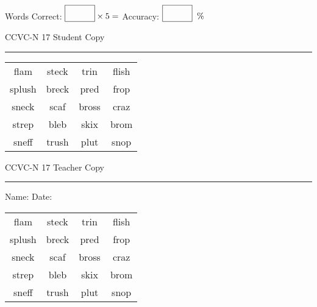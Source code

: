 \documentclass{memoir}
\begin{document}
\small

Words Correct: $\fbox{\phantom{\huge 100}} \times 5 = $ Accuracy: $\fbox{\phantom{\huge 100}}\;\; \%$ 

\vfill

\newpage


\footnotesize \noindent
CCVC-N 17 \hfill Student Copy
\smallskip
\hrule

\Large

\setlength{\tabcolsep}{14pt}
\def\arraystretch{3}

{\selectfont


\begin{vplace}[0.5]
\begin{center}
\begin{tabular}{cccc}
flam             & steck & trin & flish             \\
splush & breck       & pred & frop \\
sneck & scaf & bross       & craz       \\
strep & bleb & skix & brom          \\
sneff & trush & plut & snop \\
\end{tabular}
\end{center}
\end{vplace}

}

\newpage

\footnotesize \noindent
CCVC-N 17 \hfill Teacher Copy
\smallskip
\hrule

\small

\vfill

\noindent
Name: \underline{\hspace{1.75in}} \hfill Date: \underline{\hspace{1in}}

\Large

{\selectfont


\begin{vplace}[0.5]
\begin{center}
\begin{tabular}{cccc}
flam             & steck & trin & flish             \\
splush & breck       & pred & frop \\
sneck & scaf & bross       & craz       \\
strep & bleb & skix & brom          \\
sneff & trush & plut & snop \\
\end{tabular}
\end{center}
\end{vplace}



}
\end{document}
